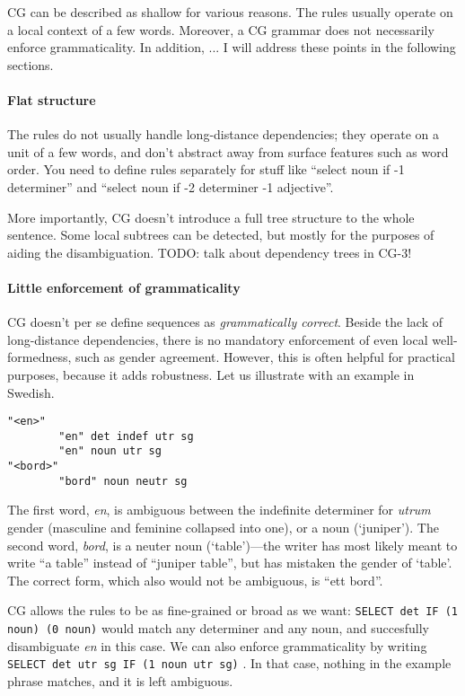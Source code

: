 CG can be described as shallow for various reasons. The rules usually
operate on a local context of a few words. Moreover, a CG grammar does
not necessarily enforce grammaticality.
In addition, ...
I will address these points in the following sections.


\paragraph{Flat structure} The rules do not usually handle 
long-distance dependencies; they operate on a unit of a few words, and
don't abstract away from surface features such as word order.
You need to define rules separately for stuff like ``select noun if -1
determiner'' and ``select noun if -2 determiner -1 adjective''.

More importantly, CG doesn't introduce a full tree structure to the
whole sentence. Some local subtrees can be detected, but mostly
for the purposes of aiding the disambiguation.
TODO: talk about dependency trees in CG-3!
 
\paragraph{Little enforcement of grammaticality} CG doesn't
per se define sequences as \emph{grammatically correct}.
Beside the lack of long-distance dependencies, there is
no mandatory enforcement of even local well-formedness, such as gender agreement.
However, this is often helpful for practical purposes, because it adds robustness.
Let us illustrate with an example in Swedish.

\begin{verbatim}
"<en>"
        "en" det indef utr sg
        "en" noun utr sg 
"<bord>"
        "bord" noun neutr sg
\end{verbatim}

The first word, \emph{en}, is ambiguous between the indefinite determiner for
\emph{utrum} gender  (masculine and feminine collapsed into one), or a noun (`juniper').
The second word, \emph{bord}, is a neuter noun (`table')---the writer has
most likely meant to write ``a table'' instead of ``juniper table'', but has mistaken the gender of `table'. The correct form, which also would not be ambiguous, is ``ett bord''.

CG allows the rules to be as fine-grained or broad as we want: 
\texttt{SELECT det IF (1 noun) (0 noun)} would match any determiner and any noun, 
and succesfully disambiguate \emph{en} in this case. 
We can also enforce grammaticality by writing \texttt{SELECT det utr sg IF (1 noun utr sg)}%
. In that case, nothing in the example phrase matches, and it is left ambiguous.


